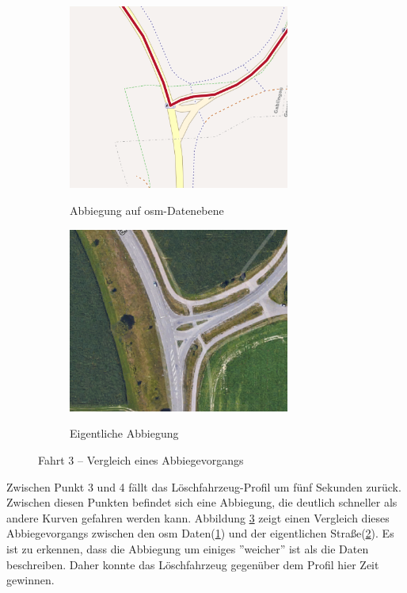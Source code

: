 \begin{figure}[htb]
\centering
\begin{subfigure}{0.49\textwidth}
\centering
\includegraphics[width = 0.80\textwidth]{../media/Fahrt3_Turn.png} \\
\caption{Abbiegung auf \gls{osm}-Datenebene}
\label{fig:turnosm}
\end{subfigure}
\begin{subfigure}{0.49\textwidth}
\centering
\includegraphics[width = 0.80\textwidth]{../media/Fahrt3_actualturn.png} \\
\caption{Eigentliche Abbiegung}
\label{fig:turnworld}
\end{subfigure}
\caption{Fahrt 3 -- Vergleich eines Abbiegevorgangs}
\label{fig:turn}
\end{figure}

Zwischen Punkt 3 und 4 fällt das Löschfahrzeug-Profil um fünf Sekunden zurück.
Zwischen diesen Punkten befindet sich eine Abbiegung, die deutlich schneller als andere Kurven gefahren werden kann.
Abbildung \ref{fig:turn} zeigt einen Vergleich dieses Abbiegevorgangs zwischen den \gls{osm} Daten(\ref{fig:turnosm}) und der eigentlichen Straße(\ref{fig:turnworld}).
Es ist zu erkennen, dass die Abbiegung um einiges ''weicher'' ist als die Daten beschreiben.
Daher konnte das Löschfahrzeug gegenüber dem Profil hier Zeit gewinnen.

